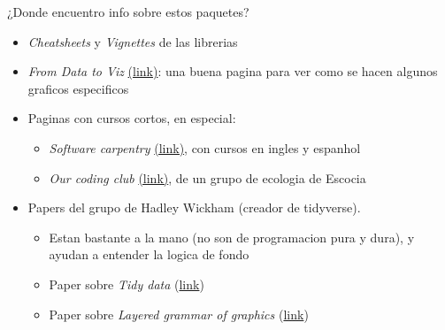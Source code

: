 \documentclass[
  10pt,
  ignorenonframetext,
]{beamer}
\providecommand{\tightlist}{%
  \setlength{\itemsep}{0pt}\setlength{\parskip}{0pt}}
\begin{document}
\begin{frame}{¿Donde encuentro info sobre estos paquetes?}
\protect\hypertarget{donde-encuentro-info-sobre-estos-paquetes-1}{}
\begin{itemize}
\item
  \emph{Cheatsheets} y \emph{Vignettes} de las librerias \vspace{10pt}
\item
  \emph{From Data to Viz} \href{https://www.data-to-viz.com/}{(link)}:
  una buena pagina para ver como se hacen algunos graficos especificos
  \vspace{10pt}
\item
  Paginas con cursos cortos, en especial: \vspace{10pt}

  \begin{itemize}
  \tightlist
  \item
    \emph{Software carpentry}
    \href{https://software-carpentry.org/}{(link)}, con cursos en ingles
    y espanhol \vspace{5pt}
  \item
    \emph{Our coding club}
    \href{https://ourcodingclub.github.io/}{(link)}, de un grupo de
    ecologia de Escocia \vspace{10pt}
  \end{itemize}
\item
  Papers del grupo de Hadley Wickham (creador de tidyverse).

  \begin{itemize}
  \tightlist
  \item
    Estan bastante a la mano (no son de programacion pura y dura), y
    ayudan a entender la logica de fondo \vspace{10pt}
  \item
    Paper sobre \emph{Tidy data}
    (\href{https://vita.had.co.nz/papers/tidy-data.pdf}{link})
    \vspace{5pt}
  \item
    Paper sobre \emph{Layered grammar of graphics}
    (\href{https://byrneslab.net/classes/biol607/readings/wickham_layered-grammar.pdf}{link})
  \end{itemize}
\end{itemize}
\end{frame}
\end{document}
